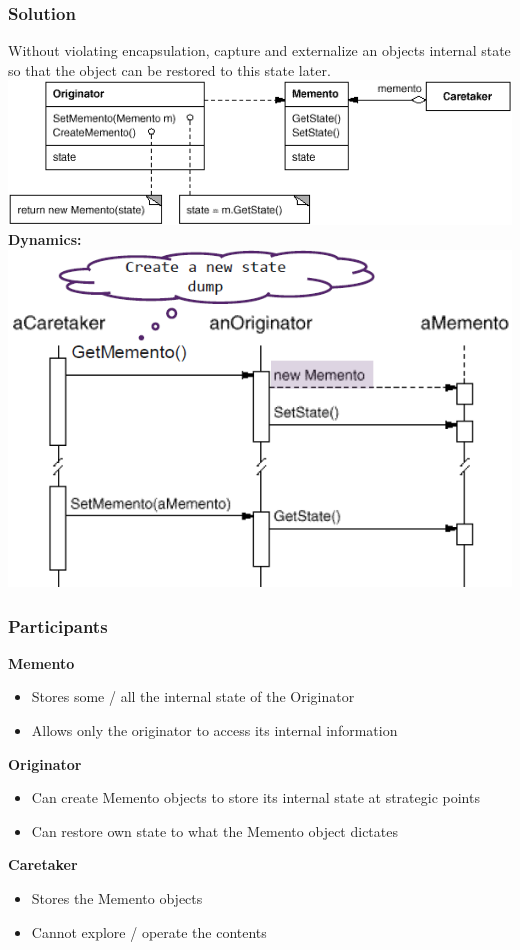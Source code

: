 \subsubsection{Solution}
Without violating encapsulation, capture and externalize an objects internal state so that the object can be restored to this state later.\\
\includegraphics[width=\linewidth]{./img/memento.png}
\textbf{Dynamics:}\\ 
\includegraphics[width=0.7\linewidth]{./img/memento_dynamic.png}

\subsubsection{Participants}
\textbf{Memento}
\begin{itemize}
    \item Stores some / all the internal state of the Originator
    \item Allows only the originator to access its internal information
\end{itemize}
\textbf{Originator}
\begin{itemize}
    \item Can create Memento objects to store its internal state at strategic points
    \item Can restore own state to what the Memento object dictates
\end{itemize}
\textbf{Caretaker}
\begin{itemize}
    \item Stores the Memento objects
    \item Cannot explore / operate the contents 
\end{itemize}
